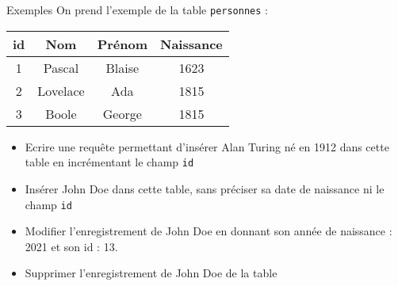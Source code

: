 \documentclass[10pt]{beamer}
\begin{document}
\begin{frame}
	\mframe{\DBB}
	\begin{exampleblock}{Exemples}
	On prend l'exemple de la table {\tt personnes} :
	\begin{center}
	 {\footnotesize \begin{tabular}{|c|c|c|c|}
	\hline
	id & Nom & Prénom & Naissance \\
	\hline
	1 & Pascal & Blaise & 1623 \\
	\hline
	2 & Lovelace & Ada & 1815 \\
	\hline
	3 & Boole & George & 1815 \\
	\hline
	\end{tabular}}
	 \end{center}
	\begin{itemize}
	\item<1-> Ecrire une requête permettant d'insérer Alan Turing né en 1912 dans cette table en incrémentant le champ {\tt id}
	\item<2-> Insérer John Doe dans cette table, sans préciser sa date de naissance ni le champ {\tt id}
	\item<3-> Modifier l'enregistrement de John Doe en donnant son année de naissance : 2021 et son id : 13.
	\item<4-> Supprimer l'enregistrement de John Doe de la table
	\end{itemize}
	\end{exampleblock}
\end{frame}
\end{document}
